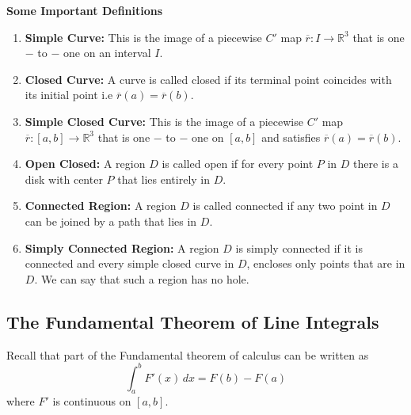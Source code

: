 \documentclass[11pt,a4paper]{article}
\theoremstyle{definition}
\newcommand{\subhead}[1]{%
  \par\medskip\noindent\textbf{#1}\par\nobreak\smallskip}
\begin{document}
\subhead{Some Important Definitions}

\begin{enumerate}
\item[]\textbf{Simple Curve:}
This is the image of  a piecewise  $C'$ map $\overline{r}: I \longrightarrow \mathbb{R}^3$ that is one$-$ to $-$ one on an interval $I$.

\item[]\textbf{Closed Curve:}
A curve is called closed if its terminal point coincides with its initial point i.e $\overline{r}(a) = \overline{r}(b)$.

\item[]\textbf{Simple Closed Curve:}
This is the image of a piecewise $C'$ map $\overline{r}: [a,b] \longrightarrow \mathbb{R}^3$ that is one $-$ to $-$ one on $[a,b]$ and satisfies $\overline{r}(a) = \overline{r}(b).$

\item[]\textbf{Open Closed:}
A region $D$ is called open if for every point $P$ in $D$ there is a disk with center $P$ that lies entirely in $D$.

\item[]\textbf{Connected Region:}
A region $D$ is called connected if any two point in $D$ can be joined by a path that lies in $D$.

\item[]\textbf{Simply Connected Region:}
A region $D$ is simply connected if it is connected and every simple closed curve in $D$, encloses only points that are in $D$.
We can say that such a region has no hole.
\end{enumerate}

{\color[wave]{485} \subsection{The Fundamental Theorem of Line Integrals}}

Recall that part of the Fundamental theorem of calculus can be written as $$\int^b_a F'(x)\,dx = F(b) - F(a)$$ where $F'$ is continuous on $[a,b]$.
\end{document}
